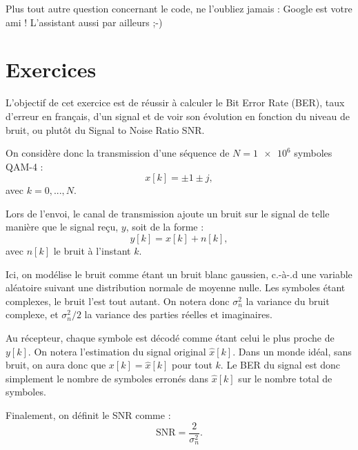 \documentclass [a4paper, 11pt] {article}
\begin{document}
    Plus tout autre question concernant le code, ne l'oubliez jamais : Google est votre ami ! L'assistant aussi par ailleurs ;-)
    
    \pagebreak
    \pagestyle{nextpages}
    \part*{Exercices}
    
    \begin{exercice}{1}
    
        L'objectif de cet exercice est de réussir à calculer le Bit Error Rate (BER), taux d'erreur en français, d'un signal et de voir son évolution en fonction du niveau de bruit, ou plutôt du Signal to Noise Ratio SNR.
        
        On considère donc la transmission d'une séquence de $N=\num{1e6}$ symboles QAM-4 :
        \begin{equation}
            x[k] = \pm 1 \pm j,
        \end{equation}
        avec $k=0,...,N$.
        
        Lors de l'envoi, le canal de transmission ajoute un bruit sur le signal de telle manière que le signal reçu, $y$, soit de la forme :
        \begin{equation}
            y[k] = x[k] + n[k],
        \end{equation}
        avec $n[k]$ le bruit à l'instant $k$.
        
        Ici, on modélise le bruit comme étant un bruit blanc gaussien, c.-à-.d une variable aléatoire suivant une distribution normale de moyenne nulle. Les symboles étant complexes, le bruit l'est tout autant. On notera donc $\sigma_n^2$ la variance du bruit complexe, et $\sigma_n^2/2$ la variance des parties réelles et imaginaires.
        
        Au récepteur, chaque symbole est décodé comme étant celui le plus proche de $y[k]$. On notera l'estimation du signal original $\hat{x}[k]$. Dans un monde idéal, sans bruit, on aura donc que $x[k]=\hat{x}[k]$ pour tout $k$. Le BER du signal est donc simplement le nombre de symboles erronés dans $\hat{x}[k]$ sur le nombre total de symboles.
        
        Finalement, on définit le SNR comme :
        \begin{equation}
            \text{SNR} = \frac{2}{\sigma_n^2}.
        \end{equation}
        

\end{exercice}
\end{document}
